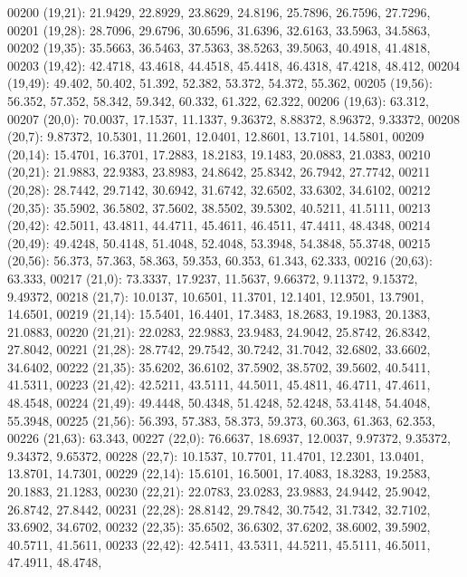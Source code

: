 \begin{DoxyCode}
00200       (19,21): 21.9429, 22.8929, 23.8629, 24.8196, 25.7896, 26.7596, 27.7296,
00201       (19,28): 28.7096, 29.6796, 30.6596, 31.6396, 32.6163, 33.5963, 34.5863,
00202       (19,35): 35.5663, 36.5463, 37.5363, 38.5263, 39.5063, 40.4918, 41.4818,
00203       (19,42): 42.4718, 43.4618, 44.4518, 45.4418, 46.4318, 47.4218, 48.412,
00204       (19,49): 49.402, 50.402, 51.392, 52.382, 53.372, 54.372, 55.362,
00205       (19,56): 56.352, 57.352, 58.342, 59.342, 60.332, 61.322, 62.322,
00206       (19,63): 63.312,
00207       (20,0): 70.0037, 17.1537, 11.1337, 9.36372, 8.88372, 8.96372, 9.33372,
00208       (20,7): 9.87372, 10.5301, 11.2601, 12.0401, 12.8601, 13.7101, 14.5801,
00209       (20,14): 15.4701, 16.3701, 17.2883, 18.2183, 19.1483, 20.0883, 21.0383,
00210       (20,21): 21.9883, 22.9383, 23.8983, 24.8642, 25.8342, 26.7942, 27.7742,
00211       (20,28): 28.7442, 29.7142, 30.6942, 31.6742, 32.6502, 33.6302, 34.6102,
00212       (20,35): 35.5902, 36.5802, 37.5602, 38.5502, 39.5302, 40.5211, 41.5111,
00213       (20,42): 42.5011, 43.4811, 44.4711, 45.4611, 46.4511, 47.4411, 48.4348,
00214       (20,49): 49.4248, 50.4148, 51.4048, 52.4048, 53.3948, 54.3848, 55.3748,
00215       (20,56): 56.373, 57.363, 58.363, 59.353, 60.353, 61.343, 62.333,
00216       (20,63): 63.333,
00217       (21,0): 73.3337, 17.9237, 11.5637, 9.66372, 9.11372, 9.15372, 9.49372,
00218       (21,7): 10.0137, 10.6501, 11.3701, 12.1401, 12.9501, 13.7901, 14.6501,
00219       (21,14): 15.5401, 16.4401, 17.3483, 18.2683, 19.1983, 20.1383, 21.0883,
00220       (21,21): 22.0283, 22.9883, 23.9483, 24.9042, 25.8742, 26.8342, 27.8042,
00221       (21,28): 28.7742, 29.7542, 30.7242, 31.7042, 32.6802, 33.6602, 34.6402,
00222       (21,35): 35.6202, 36.6102, 37.5902, 38.5702, 39.5602, 40.5411, 41.5311,
00223       (21,42): 42.5211, 43.5111, 44.5011, 45.4811, 46.4711, 47.4611, 48.4548,
00224       (21,49): 49.4448, 50.4348, 51.4248, 52.4248, 53.4148, 54.4048, 55.3948,
00225       (21,56): 56.393, 57.383, 58.373, 59.373, 60.363, 61.363, 62.353,
00226       (21,63): 63.343,
00227       (22,0): 76.6637, 18.6937, 12.0037, 9.97372, 9.35372, 9.34372, 9.65372,
00228       (22,7): 10.1537, 10.7701, 11.4701, 12.2301, 13.0401, 13.8701, 14.7301,
00229       (22,14): 15.6101, 16.5001, 17.4083, 18.3283, 19.2583, 20.1883, 21.1283,
00230       (22,21): 22.0783, 23.0283, 23.9883, 24.9442, 25.9042, 26.8742, 27.8442,
00231       (22,28): 28.8142, 29.7842, 30.7542, 31.7342, 32.7102, 33.6902, 34.6702,
00232       (22,35): 35.6502, 36.6302, 37.6202, 38.6002, 39.5902, 40.5711, 41.5611,
00233       (22,42): 42.5411, 43.5311, 44.5211, 45.5111, 46.5011, 47.4911, 48.4748,

\end{DoxyCode}
